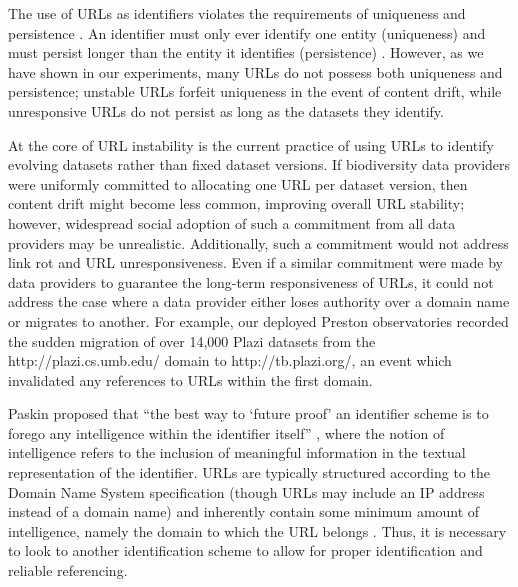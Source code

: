 The use of URLs as identifiers violates the requirements of uniqueness and persistence \citep{Paskin_1999}. An identifier must only ever identify one entity (uniqueness) and must persist longer than the entity it identifies (persistence) \citep{Paskin_1999}. However, as we have shown in our experiments, many URLs do not possess both uniqueness and persistence; unstable URLs forfeit uniqueness in the event of content drift, while unresponsive URLs do not persist as long as the datasets they identify.

At the core of URL instability is the current practice of using URLs to identify evolving datasets rather than fixed dataset versions. If biodiversity data providers were uniformly committed to allocating one URL per dataset version, then content drift might  become less common, improving overall URL stability; however, widespread social adoption of such a commitment from all data providers may be unrealistic. Additionally, such a commitment would not address link rot and URL unresponsiveness. Even if a similar commitment were made by data providers to guarantee the long-term responsiveness of URLs, it could not address the case where a data provider either loses authority over a domain name or migrates to another. For example, our deployed Preston observatories recorded the sudden migration of over 14,000 Plazi datasets from the http://plazi.cs.umb.edu/ domain to http://tb.plazi.org/, an event which invalidated any references to URLs within the first domain.

Paskin proposed that ``the best way to `future proof' an identifier scheme is to forego any intelligence within the identifier itself'' \citep{Paskin_1999}, where the notion of intelligence refers to the inclusion of meaningful information in the textual representation of the identifier. URLs are typically structured according to the Domain Name System specification (though URLs may include an IP address instead of a domain name) and inherently contain some minimum amount of intelligence, namely the domain to which the URL belongs \citep{rfc1034}. Thus, it is necessary to look to another identification scheme to allow for proper identification and reliable referencing.


